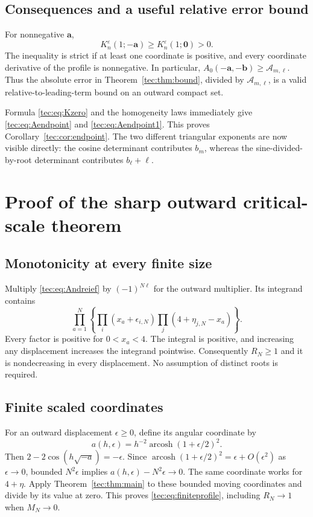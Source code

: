 \documentclass[11pt,a4paper]{article}
\numberwithin{equation}{section}
\theoremstyle{definition}
\theoremstyle{remark}
\newcommand{\ba}{\boldsymbol a}
\newcommand{\bb}{\boldsymbol b}
\begin{document}
\subsection{Consequences and a useful relative error bound}
For nonnegative $\ba$,
\begin{equation}\label{tec:eq:positive}
 K_n^\varepsilon(1;-\ba)\ge K_n^\varepsilon(1;\boldsymbol0)>0.
\end{equation}
The inequality is strict if at least one coordinate is positive, and
every coordinate derivative of the profile is nonnegative. In particular,
$A_0(-\ba,-\bb)\ge\mathcal A_{m,\ell}$. Thus the absolute error in
Theorem~\ref{tec:thm:bound}, divided by $\mathcal A_{m,\ell}$, is a valid
relative-to-leading-term bound on an outward compact set.

Formula \eqref{tec:eq:Kzero} and the homogeneity laws immediately give
\eqref{tec:eq:Aendpoint} and \eqref{tec:eq:Aendpoint1}. This proves
Corollary~\ref{tec:cor:endpoint}. The two different triangular exponents
are now visible directly: the cosine determinant contributes $b_m$,
whereas the sine-divided-by-root determinant contributes $b_\ell+\ell$.

\section{Proof of the sharp outward critical-scale theorem}\label{tec:sec:scaleproof}
\subsection{Monotonicity at every finite size}
Multiply \eqref{tec:eq:Andreief} by $(-1)^{N\ell}$ for the outward
multiplier. Its integrand contains
\[
 \prod_{a=1}^N\left\{
 \prod_i(x_a+\epsilon_{i,N})
 \prod_j(4+\eta_{j,N}-x_a)\right\}.
\]
Every factor is positive for $0<x_a<4$. The integral is positive, and
increasing any displacement increases the integrand pointwise.
Consequently $R_N\ge1$ and it is nondecreasing in every displacement.
No assumption of distinct roots is required.

\subsection{Finite scaled coordinates}
For an outward displacement $\epsilon\ge0$, define its angular coordinate
by
\begin{equation}\label{tec:eq:inversecoord}
 a(h,\epsilon)=h^{-2}\operatorname{arcosh}(1+\epsilon/2)^2.
\end{equation}
Then $2-2\cos(h\sqrt{-a})=-\epsilon$. Since
$\operatorname{arcosh}(1+\epsilon/2)^2=\epsilon+O(\epsilon^2)$ as
$\epsilon\to0$, bounded $N^2\epsilon$ implies
$a(h,\epsilon)-N^2\epsilon\to0$. The same coordinate works for
$4+\eta$. Apply Theorem~\ref{tec:thm:main} to these bounded moving
coordinates and divide by its value at zero. This proves
\eqref{tec:eq:finiteprofile}, including $R_N\to1$ when $M_N\to0$.
\end{document}
